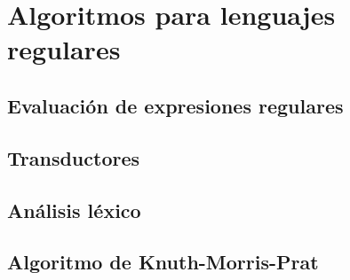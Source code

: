 \section{Algoritmos para lenguajes regulares}

\subsection{Evaluación de expresiones regulares}

\subsection{Transductores}

\subsection{Análisis léxico}

\subsection{Algoritmo de Knuth-Morris-Prat}